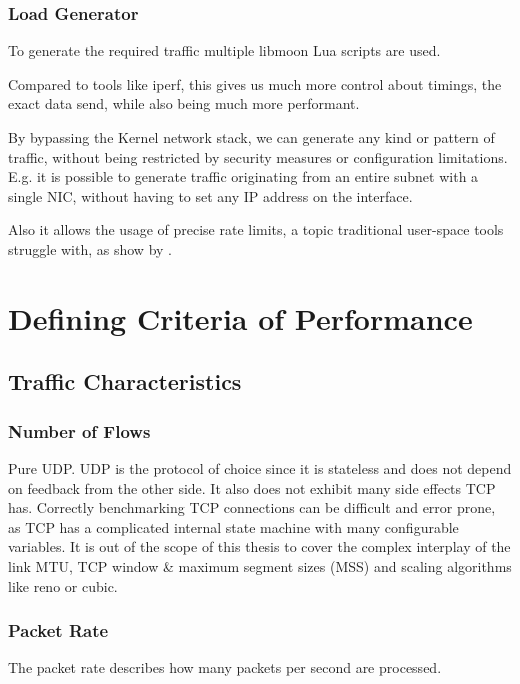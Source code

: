 \documentclass[IN,11pt,twoside,openright,master,english]{tumthesis}
\begin{document}
\subsubsection{Load Generator}
To generate the required traffic multiple libmoon Lua scripts are used. 

Compared to tools like iperf, this gives us much more control about timings, the exact data send, while also being much more performant. 

By bypassing the Kernel network stack, we can generate any kind or pattern of traffic, without being restricted by security measures or configuration limitations. E.g. it is possible to generate traffic originating from an entire subnet with a single NIC, without having to set any IP address on the interface.

Also it allows the usage of precise rate limits, a topic traditional user-space tools struggle with, as show by \cite{todo}.


\section{Defining Criteria of Performance}


\subsection{Traffic Characteristics}
\subsubsection{Number of Flows}

Pure UDP. UDP is the protocol of choice since it is stateless and does not depend on feedback from the other side. 
It also does not exhibit many side effects TCP has. Correctly benchmarking TCP connections can be difficult and error prone, as TCP has a complicated internal state machine with many configurable variables. It is out of the scope of this thesis to cover the complex interplay of the link MTU, TCP window \& maximum segment sizes (MSS) and scaling algorithms like reno or cubic.

\subsubsection{Packet Rate}
The packet rate describes how many packets per second are processed.
\end{document}
